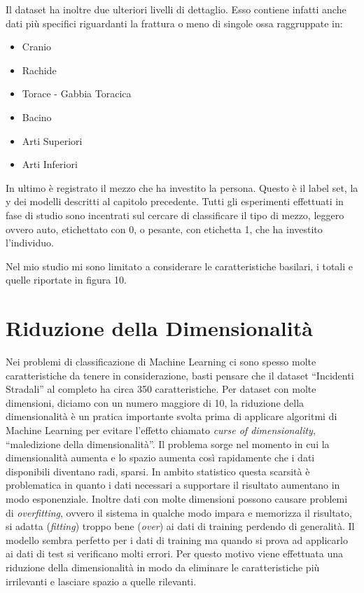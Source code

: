 \documentclass[12pt,italian]{report}
\begin{document}
Il dataset ha inoltre due ulteriori livelli di dettaglio. Esso contiene infatti anche dati più specifici riguardanti la frattura o meno di singole ossa raggruppate in:
\begin{itemize}
	\item Cranio
	\item Rachide
	\item Torace - Gabbia Toracica
	\item Bacino
	\item Arti Superiori
	\item Arti Inferiori
\end{itemize}
In ultimo è registrato il mezzo che ha investito la persona. Questo è il label set, la y dei modelli descritti al capitolo precedente. Tutti gli esperimenti effettuati in fase di studio sono incentrati sul cercare di classificare il tipo di mezzo, leggero ovvero auto, etichettato con 0, o pesante, con etichetta 1, che ha investito l'individuo.

Nel mio studio mi sono limitato a considerare le caratteristiche basilari, i totali e quelle riportate in figura 10.
\section{Riduzione della Dimensionalità}
\label{sec:riduzione}
Nei problemi di classificazione di Machine Learning ci sono spesso molte caratteristiche da tenere in considerazione, basti pensare che il dataset ``Incidenti Stradali'' al completo ha circa 350 caratteristiche. Per dataset con molte dimensioni, diciamo con un numero maggiore di 10, la riduzione della dimensionalità è un pratica importante svolta prima di applicare algoritmi di Machine Learning per evitare l'effetto chiamato \textit{curse of dimensionality}, ``maledizione della dimensionalità''. Il problema sorge nel momento in cui la dimensionalità aumenta e lo spazio aumenta così rapidamente che i dati disponibili diventano radi, sparsi. In ambito statistico questa scarsità è problematica in quanto i dati necessari a supportare il risultato aumentano in modo esponenziale.
Inoltre dati con molte dimensioni possono causare problemi di \textit{overfitting}, ovvero il sistema in qualche modo impara e memorizza il risultato, si adatta (\textit{fitting}) troppo bene (\textit{over}) ai dati di training perdendo di generalità. Il modello sembra perfetto per i dati di training ma quando si prova ad applicarlo ai dati di test si verificano molti errori.
Per questo motivo viene effettuata una riduzione della dimensionalità in modo da eliminare le caratteristiche più irrilevanti e lasciare spazio a quelle rilevanti. 
\end{document}
